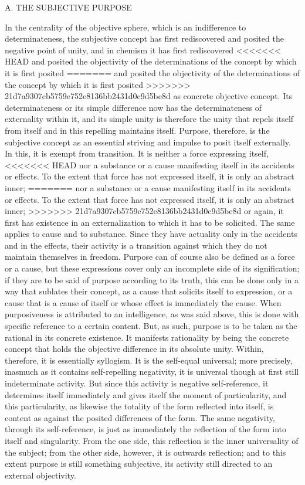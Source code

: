 
A. THE SUBJECTIVE PURPOSE

In the centrality of the objective sphere,
which is an indifference to determinateness,
the subjective concept has first rediscovered
and posited the negative point of unity,
and in chemism it has first rediscovered
<<<<<<< HEAD
and posited the objectivity of the determinations
of the concept by which it is first posited
=======
and posited the objectivity of
the determinations of the concept
by which it is first posited
>>>>>>> 21d7a9307cb5759e752e8136bb2431d0c9d5be8d
as concrete objective concept.
Its determinateness or its simple difference now
has the determinateness of externality within it,
and its simple unity is therefore
the unity that repels itself from itself
and in this repelling maintains itself.
Purpose, therefore, is the subjective concept as
an essential striving and impulse
to posit itself externally.
In this, it is exempt from transition.
It is neither a force expressing itself,
<<<<<<< HEAD
nor a substance or a cause manifesting
itself in its accidents or effects.
To the extent that force has not expressed
itself, it is only an abstract inner;
=======
nor a substance or a cause manifesting itself
in its accidents or effects.
To the extent that force has not expressed itself,
it is only an abstract inner;
>>>>>>> 21d7a9307cb5759e752e8136bb2431d0c9d5be8d
or again, it first has existence in
an externalization to which it has to be solicited.
The same applies to cause and to substance.
Since they have actuality only in
the accidents and in the effects,
their activity is a transition against which
they do not maintain themselves in freedom.
Purpose can of course also be
defined as a force or a cause,
but these expressions cover only
an incomplete side of its signification;
if they are to be said of purpose according to its truth,
this can be done only in a way that sublates their concept,
as a cause that solicits itself to expression,
or a cause that is a cause of itself
or whose effect is immediately the cause.
When purposiveness is attributed to
an intelligence, as was said above,
this is done with specific reference
to a certain content.
But, as such, purpose is to be taken as
the rational in its concrete existence.
It manifests rationality by being
the concrete concept that holds
the objective difference in its absolute unity.
Within, therefore, it is essentially syllogism.
It is the self-equal universal;
more precisely, inasmuch as it contains
self-repelling negativity,
it is universal though at first
still indeterminate activity.
But since this activity is negative self-reference,
it determines itself immediately and
gives itself the moment of particularity,
and this particularity,
as likewise the totality of the form reflected into itself,
is content as against the posited differences of the form.
The same negativity, through its self-reference,
is just as immediately the reflection of the form
into itself and singularity.
From the one side, this reflection is
the inner universality of the subject;
from the other side, however,
it is outwards reflection;
and to this extent purpose is
still something subjective,
its activity still directed to
an external objectivity.

